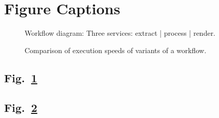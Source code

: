 \documentclass[a4paper]{article}
\begin{document}
\section*{Figure Captions}

\begin{figure}[h]
\caption{Workflow diagram: Three services: extract | process | render.}\label{fig:workflow}
\end{figure}

\begin{figure}[h]
\caption{Comparison of execution speeds of variants of a workflow.}\label{fig:workflowspeeds}
\end{figure}

\newpage

\subsection*{Fig.~\ref{fig:workflow}}

\newpage

\subsection*{Fig.~\ref{fig:workflowspeeds}}

\end{document}
